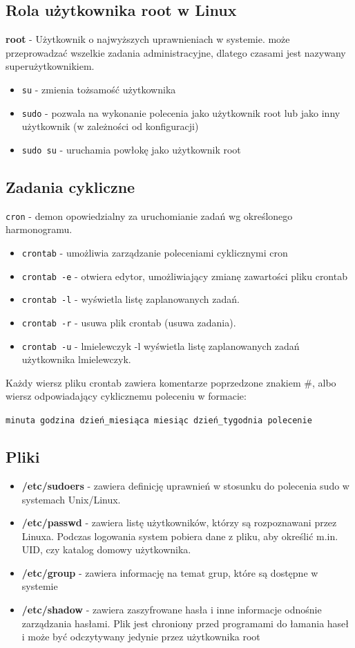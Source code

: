 \documentclass{article}
\begin{document}
\subsection{Rola użytkownika root w Linux}
\textbf{root} - Użytkownik o najwyższych uprawnieniach w systemie. może przeprowadzać wszelkie zadania administracyjne, dlatego czasami jest nazywany superużytkownikiem.
\begin{itemize}
    \item \texttt{su} - zmienia tożsamość użytkownika
    \item \texttt{sudo} - pozwala na wykonanie polecenia jako użytkownik root lub jako inny użytkownik (w zależności od konfiguracji)
    \item \texttt{sudo su} - uruchamia powłokę jako użytkownik root
\end{itemize}

\subsection{Zadania cykliczne}
\texttt{cron} - demon opowiedzialny za uruchomianie zadań wg określonego harmonogramu.
\begin{itemize}
    \item \texttt{crontab} - umożliwia zarządzanie poleceniami cyklicznymi cron
    \item \texttt{crontab -e} - otwiera edytor, umożliwiający zmianę zawartości pliku crontab
    \item \texttt{crontab -l} - wyświetla listę zaplanowanych zadań.
    \item \texttt{crontab -r} - usuwa plik crontab (usuwa zadania).
    \item \texttt{crontab -u} - lmielewczyk -l wyświetla listę zaplanowanych zadań użytkownika lmielewczyk.
\end{itemize}

Każdy wiersz pliku crontab zawiera komentarze poprzedzone znakiem \#, albo wiersz odpowiadający cyklicznemu poleceniu w formacie:

\texttt{minuta godzina dzień\_miesiąca miesiąc dzień\_tygodnia polecenie}

\subsection{Pliki}
\begin{itemize}
    \item \textbf{/etc/sudoers} - zawiera definicję uprawnień w stosunku do polecenia sudo w systemach Unix/Linux.
    \item \textbf{/etc/passwd} - zawiera listę użytkowników, którzy są rozpoznawani przez Linuxa. Podczas logowania system pobiera dane z pliku, aby określić m.in. UID, czy katalog domowy użytkownika.
    \item \textbf{/etc/group} - zawiera informację na temat grup, które są dostępne w systemie
    \item \textbf{/etc/shadow} - zawiera zaszyfrowane hasła i inne informacje odnośnie zarządzania hasłami. Plik jest chroniony przed programami do łamania haseł i może być odczytywany jedynie przez użytkownika root
\end{itemize}
\end{document}
